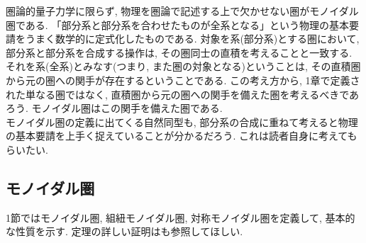\documentclass[a4paper,12pt]{ltjsarticle}
\theoremstyle{break}
\numberwithin{equation}{section}
\begin{document}
圏論的量子力学に限らず, 物理を圏論で記述する上で欠かせない圏がモノイダル圏である. 
「部分系と部分系を合わせたものが全系となる」という物理の基本要請をうまく数学的に定式化したものである. 
対象を系(部分系)とする圏において, 部分系と部分系を合成する操作は, その圏同士の直積を考えることと一致する. 
それを系(全系)とみなす(つまり, また圏の対象となる)ということは, その直積圏から元の圏への関手が存在するということである. 
この考え方から, 1章で定義された単なる圏ではなく, 直積圏から元の圏への関手を備えた圏を考えるべきであろう. 
モノイダル圏はこの関手を備えた圏である. \\
モノイダル圏の定義に出てくる自然同型も, 部分系の合成に重ねて考えると物理の基本要請を上手く捉えていることが分かるだろう. 
これは読者自身に考えてもらいたい.  

\subsection{モノイダル圏}
1節ではモノイダル圏, 組紐モノイダル圏, 対称モノイダル圏を定義して, 基本的な性質を示す. 
定理の詳しい証明は\cite{CWM}も参照してほしい. 
\end{document}
